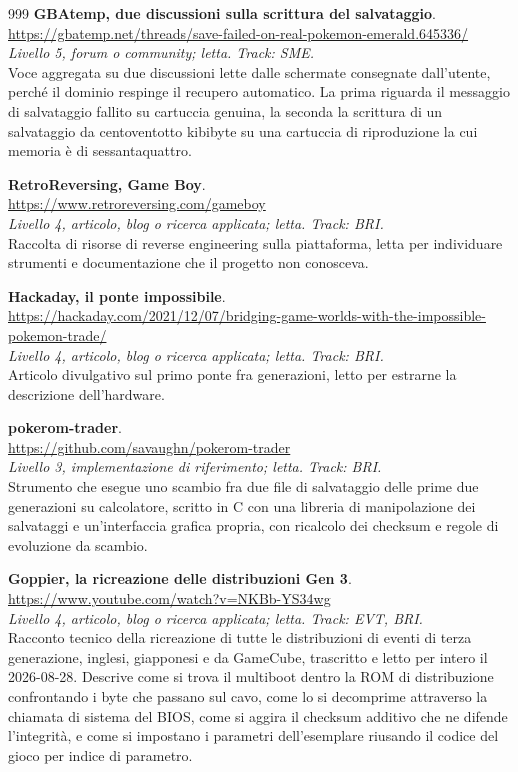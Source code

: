 \begin{thebibliography}{999}
  \textbf{GBAtemp, due discussioni sulla scrittura del salvataggio}.
  \\ \url{https://gbatemp.net/threads/save-failed-on-real-pokemon-emerald.645336/}
  \\ \emph{Livello 5, forum o community; letta. Track: SME.}
  \\ Voce aggregata su due discussioni lette dalle schermate consegnate dall'utente, perché il dominio respinge il recupero automatico. La prima riguarda il messaggio di salvataggio fallito su cartuccia genuina, la seconda la scrittura di un salvataggio da centoventotto kibibyte su una cartuccia di riproduzione la cui memoria è di sessantaquattro.

  \textbf{RetroReversing, Game Boy}.
  \\ \url{https://www.retroreversing.com/gameboy}
  \\ \emph{Livello 4, articolo, blog o ricerca applicata; letta. Track: BRI.}
  \\ Raccolta di risorse di reverse engineering sulla piattaforma, letta per individuare strumenti e documentazione che il progetto non conosceva.

  \textbf{Hackaday, il ponte impossibile}.
  \\ \url{https://hackaday.com/2021/12/07/bridging-game-worlds-with-the-impossible-pokemon-trade/}
  \\ \emph{Livello 4, articolo, blog o ricerca applicata; letta. Track: BRI.}
  \\ Articolo divulgativo sul primo ponte fra generazioni, letto per estrarne la descrizione dell'hardware.

  \textbf{pokerom-trader}.
  \\ \url{https://github.com/savaughn/pokerom-trader}
  \\ \emph{Livello 3, implementazione di riferimento; letta. Track: BRI.}
  \\ Strumento che esegue uno scambio fra due file di salvataggio delle prime due generazioni su calcolatore, scritto in C con una libreria di manipolazione dei salvataggi e un'interfaccia grafica propria, con ricalcolo dei checksum e regole di evoluzione da scambio.

  \textbf{Goppier, la ricreazione delle distribuzioni Gen 3}.
  \\ \url{https://www.youtube.com/watch?v=NKBb-YS34wg}
  \\ \emph{Livello 4, articolo, blog o ricerca applicata; letta. Track: EVT, BRI.}
  \\ Racconto tecnico della ricreazione di tutte le distribuzioni di eventi di terza generazione, inglesi, giapponesi e da GameCube, trascritto e letto per intero il 2026-08-28. Descrive come si trova il multiboot dentro la ROM di distribuzione confrontando i byte che passano sul cavo, come lo si decomprime attraverso la chiamata di sistema del BIOS, come si aggira il checksum additivo che ne difende l'integrità, e come si impostano i parametri dell'esemplare riusando il codice del gioco per indice di parametro.


\end{thebibliography}
